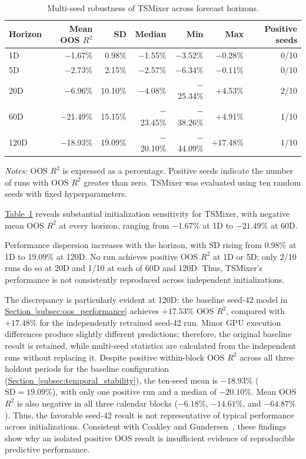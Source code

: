\documentclass[runningheads,orivec]{llncs}
\begin{document}
\begin{table}[htbp]
\centering
\caption{Multi-seed robustness of TSMixer across forecast horizons.}\label{tab:tsmixer_multiseed}
\setlength{\tabcolsep}{4.5pt}
\begin{tabular}{lrrrrrr}
\hline
Horizon & Mean OOS $R^2$ & SD & Median & Min & Max & Positive seeds \\
\hline
1D   & $-$1.67\%  & 0.98\%  & $-$1.55\%  & $-$3.52\%  & $-$0.28\% & 0/10 \\
5D   & $-$2.73\%  & 2.15\%  & $-$2.57\%  & $-$6.34\%  & $-$0.11\% & 0/10 \\
20D  & $-$6.96\%  & 10.10\% & $-$4.08\%  & $-$25.34\% & +4.53\%   & 2/10 \\
60D  & $-$21.49\% & 15.15\% & $-$23.45\% & $-$38.26\% & +4.91\%   & 1/10 \\
120D & $-$18.93\% & 19.09\% & $-$20.10\% & $-$44.09\% & +17.48\%  & 1/10 \\
\hline
\end{tabular}
\par\vspace{4pt}\parbox{\linewidth}{\scriptsize\textit{Notes:} OOS $R^2$ is expressed as a percentage. Positive seeds indicate the number of runs with OOS $R^2$ greater than zero. TSMixer was evaluated using ten random seeds with fixed hyperparameters.}
\end{table}

\hyperref[tab:tsmixer_multiseed]{Table~\ref*{tab:tsmixer_multiseed}} reveals substantial initialization sensitivity for TSMixer, with negative mean OOS $R^2$ at every horizon, ranging from $-1.67\%$ at 1D to $-21.49\%$ at 60D.

Performance dispersion increases with the horizon, with SD rising from 0.98\% at 1D to 19.09\% at 120D. No run achieves positive OOS $R^2$ at 1D or 5D; only 2/10 runs do so at 20D and 1/10 at each of 60D and 120D. Thus, TSMixer's performance is not consistently reproduced across independent initializations.

The discrepancy is particularly evident at 120D: the baseline seed-42 model in \hyperref[subsec:oos_performance]{Section~\ref*{subsec:oos_performance}} achieves $+17.53\%$ OOS $R^2$, compared with $+17.48\%$ for the independently retrained seed-42 run. Minor GPU execution differences produce slightly different predictions; therefore, the original baseline result is retained, while multi-seed statistics are calculated from the independent runs without replacing it. Despite positive within-block OOS $R^2$ across all three holdout periods for the baseline configuration (\hyperref[subsec:temporal_stability]{Section~\ref*{subsec:temporal_stability}}), the ten-seed mean is $-18.93\%$ ($\mathrm{SD}=19.09\%$), with only one positive run and a median of $-20.10\%$. Mean OOS $R^2$ is also negative in all three calendar blocks ($-6.18\%$, $-14.61\%$, and $-64.87\%$). Thus, the favorable seed-42 result is not representative of typical performance across initializations. Consistent with Coakley and Gundersen~\cite{coakley2026}, these findings show why an isolated positive OOS result is insufficient evidence of reproducible predictive performance.
\end{document}
